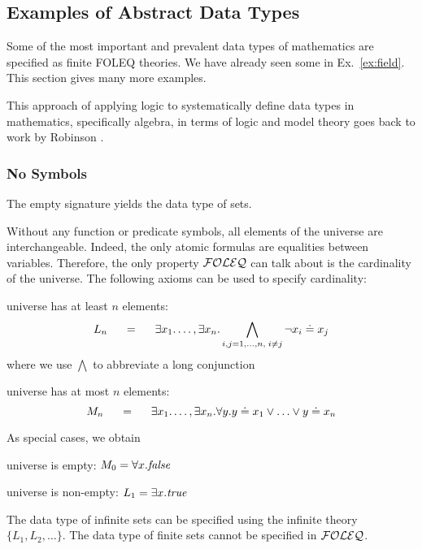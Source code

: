 \subsection{Examples of Abstract Data Types}

Some of the most important and prevalent data types of mathematics are specified as finite FOLEQ theories.
We have already seen some in Ex.~\ref{ex:field}.
This section gives many more examples.

This approach of applying logic to systematically define data types in mathematics, specifically algebra, in terms of logic and model theory goes back to work by Robinson \cite{robinsonmodeltheory}.

\subsubsection{No Symbols}

The empty signature yields the data type of sets.

Without any function or predicate symbols, all elements of the universe are interchangeable.
Indeed, the only atomic formulas are equalities between variables.
Therefore, the only property ${\mathcal{FOLEQ}}$ can talk about is the cardinality of the universe.
The following axioms can be used to specify cardinality:
\begin{compactitem}
\item universe has at least $n$ elements: \[L_n\hspace*{.5cm}=\hspace*{.5cm}\exists x_1.\ldots,\exists x_n.\bigwedge_{i,j=1,\ldots,n,\;i\neq j}\neg x_i\doteq x_j\]
where we use $\bigwedge$ to abbreviate a long conjunction
\item universe has at most $n$ elements: \[M_n\hspace*{.5cm}=\hspace*{.5cm}\exists x_1.\ldots,\exists x_n.\forall y.y\doteq x_1\vee\ldots\vee y\doteq x_n\]
\end{compactitem}
As special cases, we obtain
\begin{compactitem}
\item universe is empty: $M_0=\forall x.\mathit{false}$
\item universe is non-empty: $L_1=\exists x.\mathit{true}$
\end{compactitem}


The data type of infinite sets can be specified using the infinite theory $\{L_1,L_2,\ldots\}$.
The data type of finite sets cannot be specified in ${\mathcal{FOLEQ}}$.

